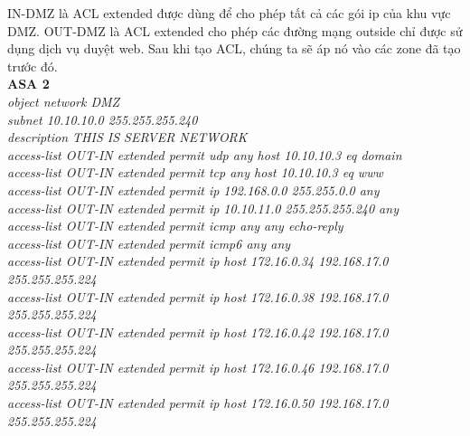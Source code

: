\documentclass[a4paper, 12pt]{article}
\begin{document}
\hspace*{1cm}IN-DMZ là ACL extended được dùng để cho phép tất cả các gói ip của khu vực DMZ. OUT-DMZ là ACL extended cho phép các đường mạng outside chỉ được sử dụng dịch vụ duyệt web. Sau khi tạo ACL, chúng ta sẽ áp nó vào các zone đã tạo trước đó.\\
\hspace*{1cm}\textbf{ASA 2}\\
\hspace*{1cm}\textit{object network DMZ\\
\hspace*{1cm}subnet 10.10.10.0 255.255.255.240\\
\hspace*{1cm}description THIS IS SERVER NETWORK\\
\hspace*{1cm}access-list OUT-IN extended permit udp any host 10.10.10.3 eq domain\\
\hspace*{1cm}access-list OUT-IN extended permit tcp any host 10.10.10.3 eq www\\
\hspace*{1cm}access-list OUT-IN extended permit ip 192.168.0.0 255.255.0.0 any\\
\hspace*{1cm}access-list OUT-IN extended permit ip 10.10.11.0 255.255.255.240 any\\
\hspace*{1cm}access-list OUT-IN extended permit icmp any any echo-reply\\
\hspace*{1cm}access-list OUT-IN extended permit icmp6 any any\\
\hspace*{1cm}access-list OUT-IN extended permit ip host 172.16.0.34 192.168.17.0 255.255.255.224\\
\hspace*{1cm}access-list OUT-IN extended permit ip host 172.16.0.38 192.168.17.0 255.255.255.224\\
\hspace*{1cm}access-list OUT-IN extended permit ip host 172.16.0.42 192.168.17.0 255.255.255.224\\
\hspace*{1cm}access-list OUT-IN extended permit ip host 172.16.0.46 192.168.17.0 255.255.255.224\\
\hspace*{1cm}access-list OUT-IN extended permit ip host 172.16.0.50 192.168.17.0 255.255.255.224\\
}
\end{document}
